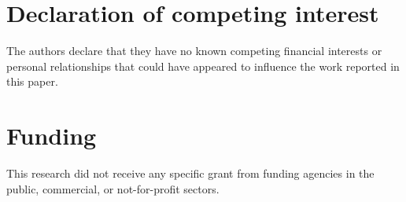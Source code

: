 \documentclass[review,number]{elsarticle}
\theoremstyle{plain}
\theoremstyle{definition}
\theoremstyle{remark}
\begin{document}
\section*{Declaration of competing interest}
The authors declare that they have no known competing financial interests or personal relationships that could have appeared to influence the work reported in this paper.

\section*{Funding}
This research did not receive any specific grant from funding agencies in the public, commercial, or not-for-profit sectors.




\appendix

\end{document}
